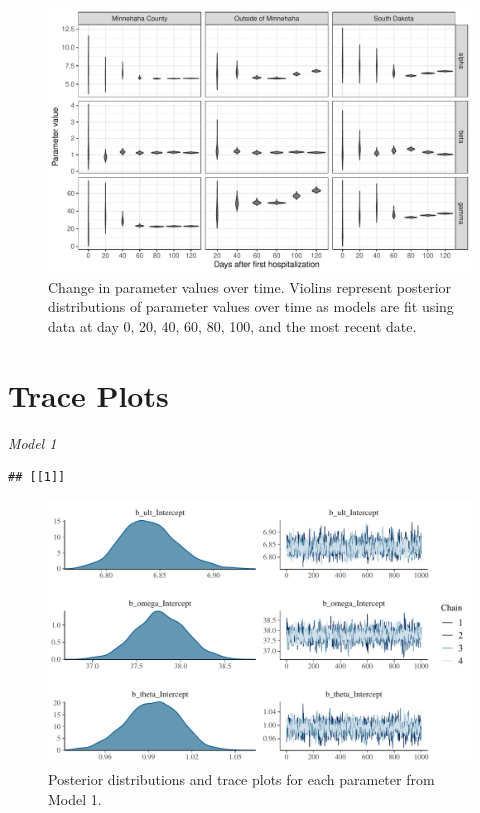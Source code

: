 \documentclass[
]{article}
\begin{document}
\begin{figure}
\centering
\includegraphics{manuscript_updates_after_submittingon7102020_files/figure-latex/unnamed-chunk-7-1.pdf}
\caption{\label{fig:unnamed-chunk-7}Change in parameter values over time. Violins represent posterior distributions of parameter values over time as models are fit using data at day 0, 20, 40, 60, 80, 100, and the most recent date.\label{param_time_plot:plot}}
\end{figure}

\newpage

\FloatBarrier

\hypertarget{trace-plots}{%
\section{Trace Plots}\label{trace-plots}}

\emph{Model 1}

\begin{verbatim}
## [[1]]
\end{verbatim}

\begin{figure}
\centering
\includegraphics{manuscript_updates_after_submittingon7102020_files/figure-latex/unnamed-chunk-8-1.pdf}
\caption{\label{fig:unnamed-chunk-8}Posterior distributions and trace plots for each parameter from Model 1.}
\end{figure}
\end{document}
